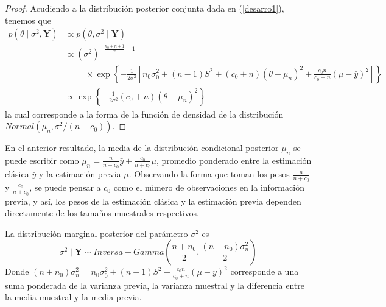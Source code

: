 \documentclass[10pt,openright]{book}\usepackage[]{graphicx}\usepackage[]{color}
\begin{document}
\begin{proof}
Acudiendo a la distribuci\'on posterior conjunta dada en (\ref{desarro1}), tenemos que
\begin{align*}
p(\theta \mid \sigma^2,\mathbf{Y})&\propto 
p(\theta,\sigma^2 \mid \mathbf{Y}) \\
&\propto(\sigma^2)^{-\frac{n_0+n+1}{2}-1}\\
&\hspace{1cm}\times
\exp\left\{-\frac{1}{2\sigma^2}\left[n_0\sigma^2_0+(n-1)S^2+(c_0+n)(\theta-\mu_n)^2+\frac{c_0n}{c_0+n}(\mu-\bar{y})^2\right]\right\}\\
&\propto \exp\left\{-\frac{1}{2\sigma^2}(c_0+n)(\theta-\mu_n)^2\right\}
\end{align*}
la cual corresponde a la forma de la funci\'on de densidad de la distribuci\'on $Normal(\mu_n, \sigma^2/(n+c_0))$.
\end{proof}

En el anterior resultado, la media de la distribuci\'on condicional posterior $\mu_n$ se puede escribir como $\mu_n=\frac{n}{n+c_0}\bar{y}+\frac{c_0}{n+c_0}\mu$, promedio ponderado entre la estimaci\'on cl\'asica $\bar{y}$ y la estimaci\'on previa $\mu$. Observando la forma que toman los pesos $\frac{n}{n+c_0}$ y $\frac{c_0}{n+c_0}$, se puede pensar a $c_0$ como el n\'umero de observaciones en la informaci\'on previa, y as\'i, los pesos de la estimaci\'on cl\'asica y la estimaci\'on previa dependen directamente de los tama\~nos muestrales respectivos.

\begin{Res}\label{Poster_sigma2_IG}
La distribuci\'on marginal posterior del par\'ametro $\sigma^2$ es
\begin{equation*}
\sigma^2 \mid \mathbf{Y} \sim Inversa-Gamma\left(\frac{n+n_0}{2},\frac{(n+n_0)\sigma^2_n}{2}\right)
\end{equation*}
Donde $(n+n_0)\sigma^2_n=n_0\sigma^2_0+(n-1)S^2+\frac{c_0n}{c_0+n}(\mu-\bar{y})^2$ corresponde a una suma ponderada de la varianza previa, la varianza muestral y la diferencia entre la media muestral y la media previa.
\end{Res}
\end{document}
